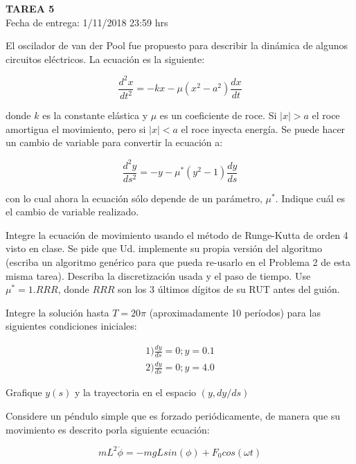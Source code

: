 \documentclass[letter, 11pt]{article}
\newcommand{\tareanro}{5}
\newcommand{\fechaentrega}{1/11/2018 23:59 hrs}
\begin{document}
\thispagestyle{firstpage}

\begin{center}
  {\uppercase{\LARGE \bf Tarea \tareanro}}\\
  Fecha de entrega: \fechaentrega
\end{center}



El oscilador de van der Pool fue propuesto para describir la dinámica de
algunos circuitos eléctricos. La ecuación es la siguiente:

$$\frac{d^2x}{dt^2} = - k x - \mu (x^2 - a^2) \frac{dx}{dt}$$

donde $k$ es la constante elástica y $\mu$ es un coeficiente de roce. Si $|x| >
a$ el roce amortigua el movimiento, pero si $|x| < a$ el roce inyecta energía.
Se puede hacer un cambio de variable para convertir la ecuación a:

$$\frac{d^2y}{ds^2} = - y - \mu^* (y^2 - 1) \frac{dy}{ds}$$

con lo cual ahora la ecuación sólo depende de un parámetro, $\mu^*$. Indique
cuál es el cambio de variable realizado.

Integre la ecuación de movimiento usando el método de Runge-Kutta de orden 4
visto en clase. Se pide que Ud. implemente su propia versión del algoritmo
(escriba un algoritmo genérico para que pueda re-usarlo en el Problema 2 de
esta misma tarea). Describa la discretización usada y el paso de tiempo. Use
$\mu^*=1.RRR$, donde $RRR$ son los 3 últimos dígitos de su RUT antes del guión.

Integre la solución hasta $T=20\pi$ (aproximadamente 10 períodos) para las
siguientes condiciones iniciales:

\begin{align*}
1) \frac{dy}{ds} = 0; y = 0.1\\
2) \frac{dy}{ds} = 0; y = 4.0
\end{align*}

Grafique $y(s)$ y la trayectoria en el espacio $(y, dy/ds)$

\vspace{1em}

Considere un péndulo simple que es forzado periódicamente, de manera que su
movimiento es descrito porla siguiente ecuación:

$$ m L^2 \ddot{\phi} = -mgLsin(\phi) + F_0 cos(\omega t) $$
\end{document}
